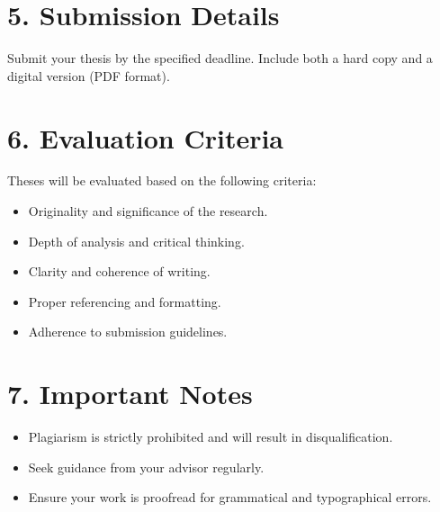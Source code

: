 \documentclass[12pt,a4paper]{article}
\begin{document}
\section*{5. Submission Details}
Submit your thesis by the specified deadline. Include both a hard copy and a digital version (PDF format).

\section*{6. Evaluation Criteria}
Theses will be evaluated based on the following criteria:
\begin{itemize}
    \item Originality and significance of the research.
    \item Depth of analysis and critical thinking.
    \item Clarity and coherence of writing.
    \item Proper referencing and formatting.
    \item Adherence to submission guidelines.
\end{itemize}

\section*{7. Important Notes}
\begin{itemize}
    \item Plagiarism is strictly prohibited and will result in disqualification.
    \item Seek guidance from your advisor regularly.
    \item Ensure your work is proofread for grammatical and typographical errors.
\end{itemize}
\end{document}

